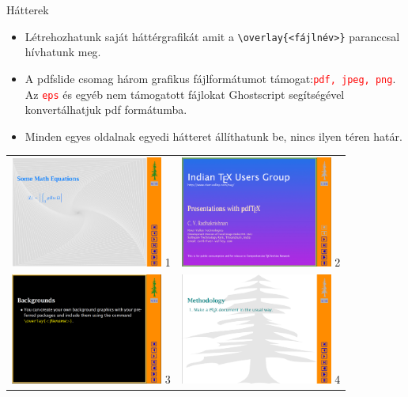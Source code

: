 \documentclass{beamer}
\begin{document}
\begin{frame}[fragile]{Hátterek}
\begin{itemize}
\item Létrehozhatunk saját háttérgrafikát amit a \color{red}\verb|\overlay{<fájlnév>}|\color{black} paranccsal hívhatunk meg.
\pause

\item A pdfslide csomag három grafikus fájlformátumot támogat:\textcolor{red}{\tt pdf, jpeg, png}. Az \textcolor{red}{\tt eps} és egyéb nem támogatott fájlokat Ghostscript segítségével konvertálhatjuk pdf formátumba.
\pause

\item Minden egyes oldalnak egyedi hátteret állíthatunk be, nincs ilyen téren
határ.


\end{itemize}
\end{frame}
\begin{frame}
\begin{tabular}{cc}
\includegraphics[width=5cm]{egyen1} 1 & \includegraphics[width=5cm]{hatter1} 2 \\
\includegraphics[width=5cm]{hatter2} 3 & \includegraphics[width=5cm]{hatter3} 4 \\ 
\end{tabular}
\end{frame}
\end{document}

